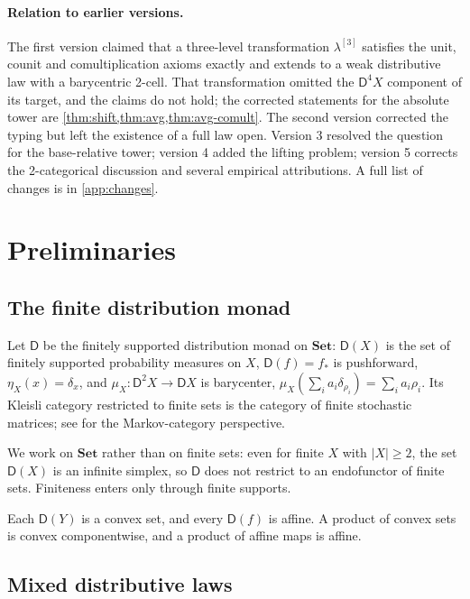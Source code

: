 \documentclass[11pt]{article}
\theoremstyle{definition}
\theoremstyle{remark}
\newcommand{\D}{\mathsf{D}}
\newcommand{\Set}{\mathbf{Set}}
\begin{document}
\paragraph{Relation to earlier versions.} The first version claimed that a three-level
transformation $\lambda^{[3]}$ satisfies the unit, counit and comultiplication axioms exactly and
extends to a weak distributive law with a barycentric 2-cell. That transformation omitted the
$\D^4X$ component of its target, and the claims do not hold; the corrected statements for the
absolute tower are \cref{thm:shift,thm:avg,thm:avg-comult}. The second version corrected the typing
but left the existence of a full law open. Version 3 resolved the question for the base-relative
tower; version 4 added the lifting problem; version 5 corrects the 2-categorical discussion and
several empirical attributions. A full list of changes is in \cref{app:changes}.

\section{Preliminaries}

\subsection{The finite distribution monad}

Let $\D$ be the finitely supported distribution monad on $\Set$: $\D(X)$ is the set of finitely
supported probability measures on $X$, $\D(f)=f_*$ is pushforward, $\eta_X(x)=\delta_x$, and
$\mu_X\colon \D^2X\to\D X$ is barycenter, $\mu_X(\sum_i a_i\delta_{\rho_i})=\sum_i a_i\rho_i$. Its
Kleisli category restricted to finite sets is the category of finite stochastic matrices; see
\cite{Fritz2020,FGPR2023} for the Markov-category perspective.

We work on $\Set$ rather than on finite sets: even for finite $X$ with $|X|\ge 2$, the set $\D(X)$ is
an infinite simplex, so $\D$ does not restrict to an endofunctor of finite sets. Finiteness enters
only through finite supports.

Each $\D(Y)$ is a convex set, and every $\D(f)$ is affine. A product of convex sets is convex
componentwise, and a product of affine maps is affine.

\subsection{Mixed distributive laws}
\end{document}
